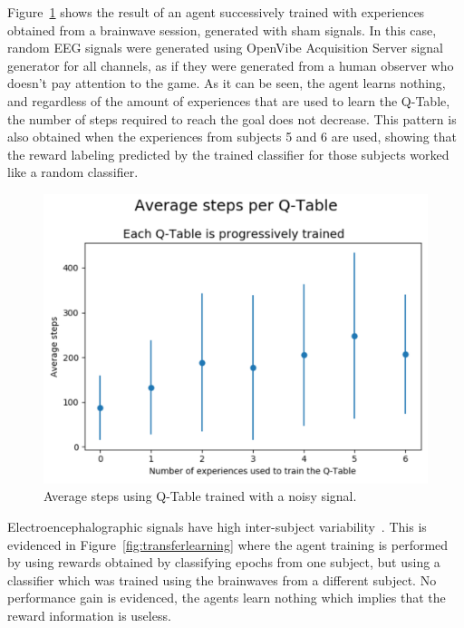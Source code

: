 \documentclass[journal]{IEEEtran}
\begin{document}
{{%

Figure~\ref{fig:avg_steps_noise} shows the result of an agent successively trained with experiences obtained from a brainwave session, generated with sham signals.  In this case, random EEG signals were generated using OpenVibe Acquisition Server signal generator for all channels, as if they were generated from a human observer who doesn't pay attention to the game.  As it can be seen, the agent learns nothing, and regardless of the amount of experiences that are used to learn the Q-Table, the number of steps required to reach the goal does not decrease.  This pattern is also obtained when the experiences from subjects 5 and 6 are used, showing that the reward labeling predicted by the trained classifier for those subjects worked like a random classifier.

\begin{figure}[h!]
\centering
\includegraphics[scale=0.4]{Images/Average_steps/noise.png}
\caption{Average steps using Q-Table trained with a noisy signal.}
\label{fig:avg_steps_noise}
\end{figure}

Electroencephalographic signals have high inter-subject variability~\cite{Chavarriaga2014}.   This is evidenced in Figure~\ref{fig:transferlearning} where the agent training is performed by using rewards obtained by classifying epochs from one subject, but using a classifier which was trained using the brainwaves from a different subject.   No performance gain is evidenced, the agents learn nothing which implies that the reward information is useless.


}}
\end{document}
